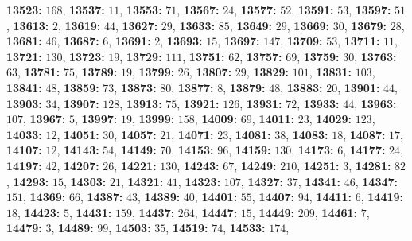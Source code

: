 \textsf{\bfseries 13523:} $168$, \textsf{\bfseries 13537:} $11$, \textsf{\bfseries 13553:} $71$, \textsf{\bfseries 13567:} $24$, \textsf{\bfseries 13577:} $52$, \textsf{\bfseries 13591:} $53$, \textsf{\bfseries 13597:} $51$, \textsf{\bfseries 13613:} $2$, \textsf{\bfseries 13619:} $44$, \textsf{\bfseries 13627:} $29$, \textsf{\bfseries 13633:} $85$, \textsf{\bfseries 13649:} $29$, \textsf{\bfseries 13669:} $30$, \textsf{\bfseries 13679:} $28$, \textsf{\bfseries 13681:} $46$, \textsf{\bfseries 13687:} $6$, \textsf{\bfseries 13691:} $2$, \textsf{\bfseries 13693:} $15$, \textsf{\bfseries 13697:} $147$, \textsf{\bfseries 13709:} $53$, \textsf{\bfseries 13711:} $11$, \textsf{\bfseries 13721:} $130$, \textsf{\bfseries 13723:} $19$, \textsf{\bfseries 13729:} $111$, \textsf{\bfseries 13751:} $62$, \textsf{\bfseries 13757:} $69$, \textsf{\bfseries 13759:} $30$, \textsf{\bfseries 13763:} $63$, \textsf{\bfseries 13781:} $75$, \textsf{\bfseries 13789:} $19$, \textsf{\bfseries 13799:} $26$, \textsf{\bfseries 13807:} $29$, \textsf{\bfseries 13829:} $101$, \textsf{\bfseries 13831:} $103$, \textsf{\bfseries 13841:} $48$, \textsf{\bfseries 13859:} $73$, \textsf{\bfseries 13873:} $80$, \textsf{\bfseries 13877:} $8$, \textsf{\bfseries 13879:} $48$, \textsf{\bfseries 13883:} $20$, \textsf{\bfseries 13901:} $44$, \textsf{\bfseries 13903:} $34$, \textsf{\bfseries 13907:} $128$, \textsf{\bfseries 13913:} $75$, \textsf{\bfseries 13921:} $126$, \textsf{\bfseries 13931:} $72$, \textsf{\bfseries 13933:} $44$, \textsf{\bfseries 13963:} $107$, \textsf{\bfseries 13967:} $5$, \textsf{\bfseries 13997:} $19$, \textsf{\bfseries 13999:} $158$, \textsf{\bfseries 14009:} $69$, \textsf{\bfseries 14011:} $23$, \textsf{\bfseries 14029:} $123$, \textsf{\bfseries 14033:} $12$, \textsf{\bfseries 14051:} $30$, \textsf{\bfseries 14057:} $21$, \textsf{\bfseries 14071:} $23$, \textsf{\bfseries 14081:} $38$, \textsf{\bfseries 14083:} $18$, \textsf{\bfseries 14087:} $17$, \textsf{\bfseries 14107:} $12$, \textsf{\bfseries 14143:} $54$, \textsf{\bfseries 14149:} $70$, \textsf{\bfseries 14153:} $96$, \textsf{\bfseries 14159:} $130$, \textsf{\bfseries 14173:} $6$, \textsf{\bfseries 14177:} $24$, \textsf{\bfseries 14197:} $42$, \textsf{\bfseries 14207:} $26$, \textsf{\bfseries 14221:} $130$, \textsf{\bfseries 14243:} $67$, \textsf{\bfseries 14249:} $210$, \textsf{\bfseries 14251:} $3$, \textsf{\bfseries 14281:} $82$, \textsf{\bfseries 14293:} $15$, \textsf{\bfseries 14303:} $21$, \textsf{\bfseries 14321:} $41$, \textsf{\bfseries 14323:} $107$, \textsf{\bfseries 14327:} $37$, \textsf{\bfseries 14341:} $46$, \textsf{\bfseries 14347:} $151$, \textsf{\bfseries 14369:} $66$, \textsf{\bfseries 14387:} $43$, \textsf{\bfseries 14389:} $40$, \textsf{\bfseries 14401:} $55$, \textsf{\bfseries 14407:} $94$, \textsf{\bfseries 14411:} $6$, \textsf{\bfseries 14419:} $18$, \textsf{\bfseries 14423:} $5$, \textsf{\bfseries 14431:} $159$, \textsf{\bfseries 14437:} $264$, \textsf{\bfseries 14447:} $15$, \textsf{\bfseries 14449:} $209$, \textsf{\bfseries 14461:} $7$, \textsf{\bfseries 14479:} $3$, \textsf{\bfseries 14489:} $99$, \textsf{\bfseries 14503:} $35$, \textsf{\bfseries 14519:} $74$, \textsf{\bfseries 14533:} $174$, 
